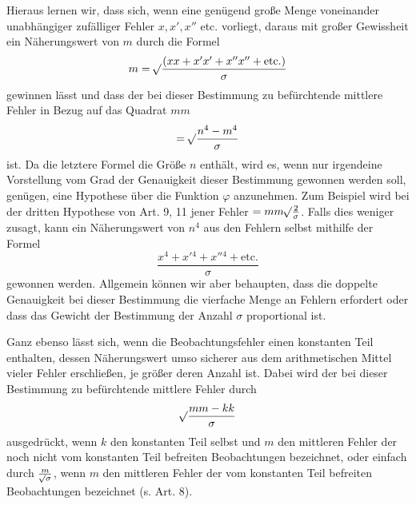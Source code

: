 Hieraus lernen wir, dass sich, wenn eine genügend große Menge voneinander unabhängiger zufälliger Fehler \(x,x',x''\) etc. vorliegt, daraus mit großer Gewissheit ein Näherungswert von \(m\) durch die Formel
\[
m=\mathord{{}^{}\!\surd}\frac{(xx+x'x'+x''x''+\text{etc.})}{\sigma}
\]
gewinnen lässt und dass der bei dieser Bestimmung zu befürchtende mittlere Fehler in Bezug auf das Quadrat \(mm\)
\[
=\mathord{{}^{}\!\surd}\frac{n^4-m^4}{\sigma}
\]
ist. Da die letztere Formel die Größe \(n\) enthält, wird es, wenn nur irgendeine Vorstellung vom Grad der Genauigkeit dieser Bestimmung gewonnen werden soll, genügen, eine Hypothese über die Funktion \(\varphi\) anzunehmen. Zum Beispiel wird bei der dritten Hypothese von Art. 9, 11 jener Fehler \(=mm\mathord{{}^{}\!\surd}\frac2\sigma\). Falls dies weniger zusagt, kann ein Näherungswert von \(n^4\) aus den Fehlern selbst mithilfe der Formel
\[
\frac{x^4+x'{}^4+x''{}^4+\text{etc.}}{\sigma}
\]
gewonnen werden. Allgemein können wir aber behaupten, dass die doppelte Genauigkeit bei dieser Bestimmung die vierfache Menge an Fehlern erfordert oder dass das Gewicht der Bestimmung der Anzahl \(\sigma\) proportional ist.

Ganz ebenso lässt sich, wenn die Beobachtungsfehler einen konstanten Teil enthalten, dessen Näherungswert umso sicherer aus dem arithmetischen Mittel vieler Fehler erschließen, je größer deren Anzahl ist. Dabei wird der bei dieser Bestimmung zu befürchtende mittlere Fehler durch
\[
\mathord{{}^{}\!\surd}\frac{mm-kk}{\sigma}
\]
ausgedrückt, wenn \(k\) den konstanten Teil selbst und \(m\) den mittleren Fehler der noch nicht vom konstanten Teil befreiten Beobachtungen bezeichnet, oder einfach durch \(\frac{m}{\mathord{{}^{}\!\surd}\sigma}\), wenn \(m\) den mittleren Fehler der vom konstanten Teil befreiten Beobachtungen bezeichnet (s. Art. 8).

\clearpage
